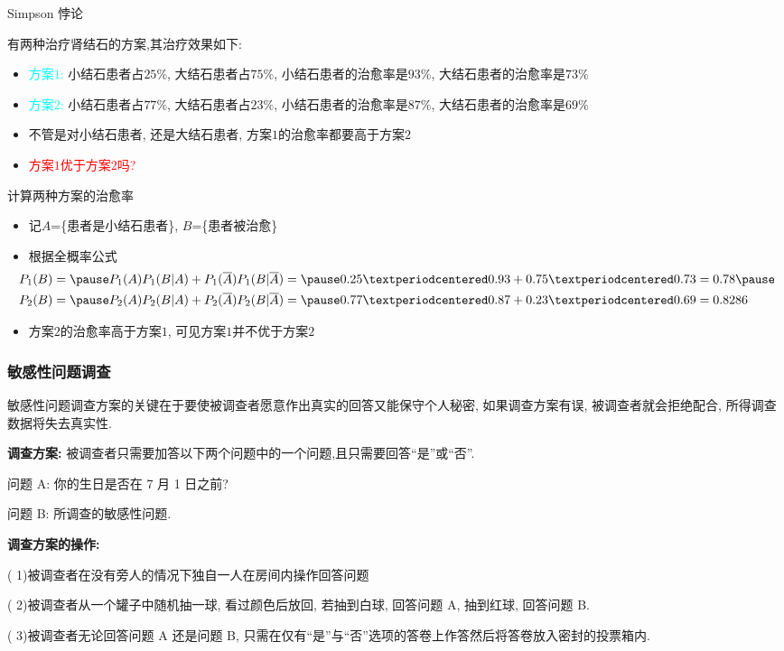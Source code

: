 \begin{frame}{Simpson 悖论}
	\begin{exam}
		有两种治疗肾结石的方案,其治疗效果如下:
		\begin{itemize}[<+-|alert@+>]
			\item \textcolor{cyan}{方案$1$:} 小结石患者占$25\%$, 大结石患者占$75\%$, 小结石患者的治愈率是$93\%$, 大结石患者的治愈率是$73\%$
			\item \textcolor{cyan}{方案$2$:} 小结石患者占$77\%$, 大结石患者占$23\%$, 小结石患者的治愈率是$87\%$, 大结石患者的治愈率是$69\%$
			\item 不管是对小结石患者, 还是大结石患者, 方案$1$的治愈率都要高于方案$2$
			\item \textcolor{red}{方案$1$优于方案$2$吗?}
		\end{itemize}
	\end{exam}
	\pause
	\begin{jieda}
		计算两种方案的治愈率
		\begin{itemize}[<+-|alert@+>]
			\item 记$A$=\{患者是小结石患者\}, $B$=\{患者被治愈\}
			\item 根据全概率公式\pause
			\begin{align*}
				&\hspace{-0.5cm}P_1(B)=\pause P_1(A)P_1(B|A)+P_1(\overline{A})P_1(B|\overline{A})=\pause 0.25·0.93+0.75·0.73=0.78\pause \\
				&\hspace{-0.5cm} P_2(B)=\pause P_2(A)P_2(B|A)+P_2(\overline{A})P_2(B|\overline{A})=\pause 0.77·0.87+0.23·0.69=0.8286
			\end{align*}
			\item 方案$2$的治愈率高于方案$1$, 可见方案$1$并不优于方案$2$
		\end{itemize}
	\end{jieda}
\end{frame}

\begin{frame}
	\frametitle{敏感性问题调查}
	敏感性问题调查方案的关键在于要使被调查者愿意作出真实的回答又能保守个人秘密, 如果调查方案有误, 被调查者就会拒绝配合, 所得调查数据将失去真实性.
	\pause
	\vspace{0.5cm}

	{\bf 调查方案: } 被调查者只需要加答以下两个问题中的一个问题,且只需要回答“是”或“否”.

	\pause
	问题 A: 你的生日是否在 7 月 1 日之前?

	问题 B: 所调查的敏感性问题.

	\pause
	\vspace{0.5cm}
	{\bf 调查方案的操作: }

	( 1)被调查者在没有旁人的情况下独自一人在房间内操作回答问题

	\pause
	( 2)被调查者从一个罐子中随机抽一球, 看过颜色后放回, 若抽到白球, 回答问题 A, 抽到红球, 回答问题 B.

	( 3)被调查者无论回答问题 A 还是问题 B, 只需在仅有“是”与“否”选项的答卷上作答然后将答卷放入密封的投票箱内.

\end{frame}

